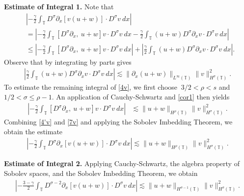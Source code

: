 \documentclass[12pt,reqno]{amsart}
\newcommand{\p}{\partial}
\newcommand{\ci}{\mathbb{T}}
\theoremstyle{plain}  %
\theoremstyle{definition}
\begin{document}
{\bf Estimate of Integral 1.} Note that
%
%
\begin{equation}
\begin{split}
& \left |  -\frac{\gamma}{2} \int_{\ci} D^\sigma \p_x [v(u+w)] \cdot
D^\sigma v \ dx \right |
\\
& =
\left |
-\frac{\gamma}{2} \int_{\ci} \left[ D^\sigma \p_x, \ u+w \right]v \cdot
D^\sigma v \ dx - \frac{\gamma}{2} \int_{\ci} (u+w) D^\sigma
\p_x v \cdot D^\sigma v\ dx
\right | \\
& \le \left |
-\frac{\gamma}{2} \int_{\ci} \left[ D^\sigma \p_x, \ u+w \right]v \cdot
D^\sigma v \ dx \right |
+ \left | \frac{\gamma}{2} \int_{\ci} (u+w) D^\sigma \p_x v
\cdot D^\sigma v\
dx \right |.
\label{4v}
\end{split}
\end{equation}
%
%
Observe that by integrating by parts gives
%
%
\begin{equation}
\begin{split}
\left | \frac{\gamma}{2}\int_{\ci} (u+w) D^\sigma \p_x v \cdot
D^\sigma v \ dx \right |
\lesssim \|\p_x (u+w)\|_{L^\infty(\ci)}
\|v\|_{H^\sigma(\ci)}^2.
\label{4'v}
\end{split}
\end{equation}
%
%
%
%
To estimate the remaining integral of \eqref{4v}, we first 
choose $\ 3/2 < \rho
< s$ and $ 1/2 < \sigma \le \rho -1$. An application of 
Cauchy-Schwartz and \autoref{cor1} then yields 
%
%
\begin{equation}
\begin{split}
 \left | -\frac{\gamma}{2} \int_{\ci} [D^\sigma \p_x, \ u+w] v
\cdot D^\sigma v \ dx \right |
& \lesssim \|u+w\|_{H^\rho(\ci)} 
\|v\|_{H^\sigma(\ci)}^2.
\label{7v}
\end{split}
\end{equation}
%
%
Combining \eqref{4'v} and \eqref{7v} and applying the Sobolev Imbedding 
Theorem, we obtain the estimate
%
%
\begin{equation}
\begin{split}
\left |  -\frac{\gamma}{2} \int_{\ci} D^\sigma \p_x [v(u+w)] \cdot
D^\sigma v \ dx \right |
 \lesssim \|u+w\|_{H^\rho(\ci)} \|v\|_{H^\sigma(\ci)}^2.
\label{8v}
\end{split}
\end{equation}
%
%

{\bf Estimate of Integral 2.} Applying Cauchy-Schwartz, the algebra property of Sobolev spaces, and the 
Sobolev Imbedding Theorem, we obtain 
%
%
%
%
\begin{equation}
\begin{split}
\left | - \frac{3-\gamma}{2} \int_{\ci}  D^{\sigma -2}
\p_x[v(u+w)] \cdot
D^\sigma v \ dx  \right |
 \lesssim \|u+w\|_{H^{\sigma -1}(\ci)} \|v\|_{H^\sigma(\ci)}^2.
\label{3v}
\end{split}
\end{equation}
%
%
%
\end{document}
